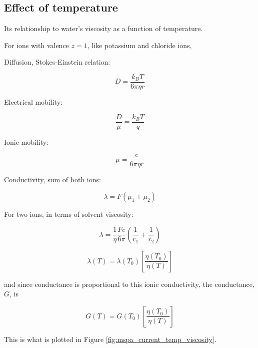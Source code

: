 \subsection{Effect of temperature}

Its relationship to water's viscosity as a function of temperature.

For ions with valence $z=1$, like potassium and chloride ions,

Diffusion, Stokes-Einstein relation:

\begin{equation}
D = \frac{k_B T}{6\pi\eta r}
\label{eqn:conductivity}
\end{equation}

Electrical mobility:

\begin{equation}
\frac{D}{\mu} = \frac{k_B T}{q}
\label{eqn:einstein_mobility}
\end{equation}

Ionic mobility:

\begin{equation}
\mu = \frac{e}{6 \pi \eta r}
\label{eqn:mobility}
\end{equation}

Conductivity, sum of both ions:

\begin{equation}
\lambda = F(\mu_1 + \mu_2)
\label{eqn:conductivity}
\end{equation}

For two ions, in terms of solvent viscosity:

\begin{equation}
\lambda = \frac{1}{\eta} \frac{Fe}{6\pi} \left( \frac{1}{r_1}+\frac{1}{r_2} \right)
\label{eqn:conductivity_eta}
\end{equation}

\begin{equation}
\lambda(T) = \lambda(T_0) \left[ \frac{\eta(T_0)}{\eta(T)} \right]
\label{eqn:conductivity_temp}
\end{equation}

and since conductance is proportional to this ionic conductivity, the conductance, $G$, is

\begin{equation}
G(T) = G(T_0) \left[ \frac{\eta(T_0)}{\eta(T)} \right]
\label{eqn:conductance_temp}
\end{equation}

This is what is plotted in Figure \ref{fig:mspa_current_temp_viscosity}.

